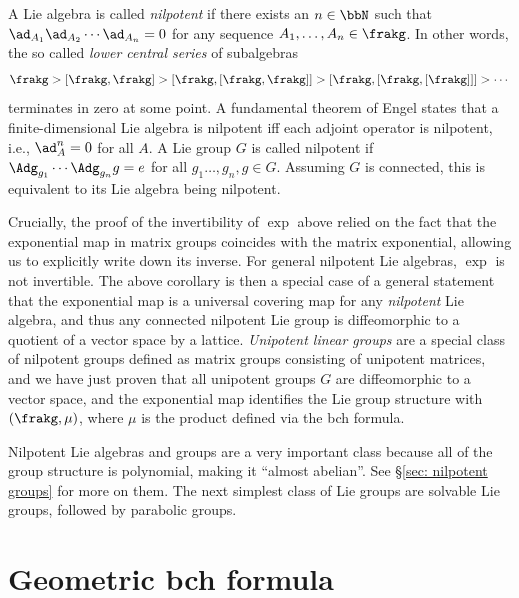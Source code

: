 \begin{rem}\label{rem nilpotent Lie alg}
    A Lie algebra is called \emph{nilpotent} if there exists an $n\in\bbN$ such that $\ad_{A_1}\ad_{A_2}\cdots \ad_{A_n}=0$ for any sequence $A_1,\ldots,A_n\in\frakg$. In other words, the so called \emph{lower central series} of subalgebras 
    \[\frakg>[\frakg,\frakg]>[\frakg,[\frakg,\frakg]]>[\frakg,[\frakg,[\frakg]]]>\cdots\]
    terminates in zero at some point. A fundamental theorem of Engel states that a finite-dimensional Lie algebra is nilpotent iff each adjoint operator is nilpotent, i.e., $\ad_A^n=0$ for all $A$. A Lie group $G$ is called nilpotent if $\Adg_{g_1}\cdots \Adg_{g_n}g=e$ for all $g_1\ldots,g_n,g\in G$. Assuming $G$  is connected, this is equivalent to its Lie algebra being nilpotent. 
    
    Crucially, the proof of the invertibility of $\exp$ above relied on the fact that the exponential map in matrix groups coincides with the matrix exponential, allowing us to explicitly write down its inverse. For general nilpotent Lie algebras, $\exp$ is not invertible. The above corollary is then a special case of a general statement that the exponential map is a universal covering map for any \emph{nilpotent} Lie algebra, and thus any connected nilpotent Lie group is diffeomorphic to a quotient of a vector space by a lattice.  \emph{Unipotent linear groups} are a special class of nilpotent groups defined as matrix groups consisting of unipotent matrices, and we have just proven that all unipotent groups $G$ are diffeomorphic to a vector space, and the exponential map identifies the Lie group structure with $(\frakg,\mu)$, where $\mu$ is the product defined via the \gls{bch} formula.

    Nilpotent Lie algebras and groups are a very important class because all of the group structure is polynomial, making it ``almost abelian''. See \S\ref{sec: nilpotent groups} for more on them. The next simplest class of Lie groups are solvable Lie groups, followed by parabolic groups.
\end{rem}





\section{Geometric \texorpdfstring{\gls{bch}}{BCH} formula}

